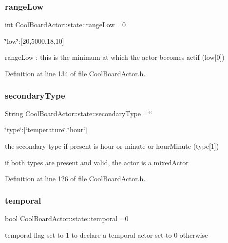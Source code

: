 \subsubsection{\texorpdfstring{range\+Low}{rangeLow}}
{\footnotesize\ttfamily int Cool\+Board\+Actor\+::state\+::range\+Low =0}

\char`\"{}low\char`\"{}\+:\mbox{[}20,5000,18,10\mbox{]}

range\+Low \+: this is the minimum at which the actor becomes actif (low\mbox{[}0\mbox{]}) 

Definition at line 134 of file Cool\+Board\+Actor.\+h.

\mbox{\label{struct_cool_board_actor_1_1state_a44e8f69868f2491b79ed075f84aa0fcb}} 
\subsubsection{\texorpdfstring{secondary\+Type}{secondaryType}}
{\footnotesize\ttfamily String Cool\+Board\+Actor\+::state\+::secondary\+Type =\char`\"{}\char`\"{}}

\char`\"{}type\char`\"{}\+:\mbox{[}\char`\"{}temperature\char`\"{},\char`\"{}hour\char`\"{}\mbox{]}

the secondary type if present is hour or minute or hour\+Minute (type\mbox{[}1\mbox{]})

if both types are present and valid, the actor is a mixed\+Actor 

Definition at line 126 of file Cool\+Board\+Actor.\+h.

\mbox{\label{struct_cool_board_actor_1_1state_a6442a8c3a30abc48472f3e5284b786ea}} 
\subsubsection{\texorpdfstring{temporal}{temporal}}
{\footnotesize\ttfamily bool Cool\+Board\+Actor\+::state\+::temporal =0}

temporal flag set to 1 to declare a temporal actor set to 0 otherwise 

